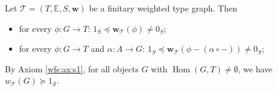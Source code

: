 \begin{lemma}
\label{lem:wf:morphism_weight_geq_1_neq_0}
Let $\mathcal{T} = (T, \mathbb{E}, S, \mathbf{w})$ be a finitary weighted type graph. Then
\begin{itemize}
    \item for every $\phi : G \to T$: $1_S \preceq \mathbf{w}_\mathcal{T}(\phi) \neq 0_S$;
    \item for every $\phi : G \to T$ and $\alpha : A \to G$: $1_S \preceq \mathbf{w}_\mathcal{T}(\phi - (\alpha \circ -)) \neq 0_S$;
\end{itemize}
\end{lemma}
\begin{remark}
    \label{rem:wf:weight_of_object_geq_1}
    By Axiom \eqref{wfs:ax:s1}, for all objects \( G \) with $\operatorname{Hom}(G,T)\neq \emptyset$, we have \( 
    w_\mathcal{T}(G) \succeq 1_\mathcal{S} \).
\end{remark}